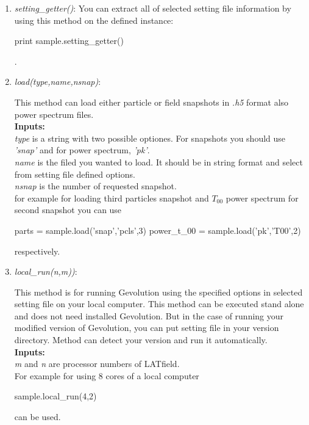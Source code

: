 \documentclass[a4paper, 12 pt]{article}
\begin{document}
\begin{enumerate}

\item \textit{setting\_getter()}: 
You can extract all of selected setting file information by using this method on the defined instance:

\begin{python}[language=Python, caption=setting getter]
print sample.setting_getter()
\end{python}.

\item \textit{load(type,name,nsnap)}:

This method can load either particle or field snapshots in \textit{.h5} format also power spectrum files.\\
\textbf{Inputs:}\\
\textit{type} is a string with two possible optiones. For snapshots you should use \textit{'snap'} and for power spectrum, \textit{'pk'}.\\
\textit{name} is the filed you wanted to load. It should be in string format and select from setting file defined options.\\
\textit{nsnap} is the number of requested snapshot.\\

for example for loading third particles snapshot and $T_{00}$ power spectrum for second snapshot you can use 

\begin{python}[language=Python, caption=setting getter]
parts = sample.load('snap','pcls',3)
power_t_00 = sample.load('pk','T00',2)
\end{python} respectively.


\item \textit{local\_run(n,m))}:

This method is for running Gevolution using the specified options in selected setting file on your local computer. This method can be executed stand alone and does not need installed Gevolution. But in the case of running your modified version of Gevolution, you can put setting file in your version directory. Method can detect your version and run it automatically. \\
\textbf{Inputs:}\\
\textit{m} and \textit{n} are processor numbers of LATfield.\\

For example for using 8 cores of a local computer 
\begin{python}[language=Python, caption=local run]
sample.local_run(4,2)
\end{python}
can be used.


\end{enumerate}
\end{document}
